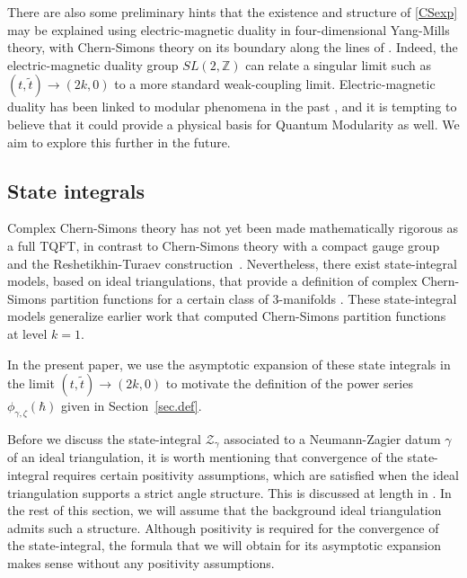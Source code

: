 \documentclass[12pt]{amsart}
\theoremstyle{definition}
\def\ga{\gamma}
\newcommand{\CZ}{\mathcal{Z}}
\begin{document}
There are also some preliminary hints that the 
existence and structure of \eqref{CSexp} may be explained using 
electric-magnetic duality in four-dimensional Yang-Mills theory, with 
Chern-Simons theory on its boundary along the lines of \cite{Witten-q, Witten-5}. 
Indeed, the electric-magnetic duality group $SL(2,\mathbb Z)$ can relate a 
singular limit such as $(t,\tilde t)\to(2k,0)$ to a more standard 
weak-coupling limit. Electric-magnetic duality has been linked to modular 
phenomena in the past \cite{VafaWitten}, and it is tempting to believe that 
it could provide a physical basis for Quantum Modularity as well.
We aim to explore this further in the future.

\subsection{State integrals}

Complex Chern-Simons theory has not yet been made mathematically rigorous 
as a full TQFT, in contrast to Chern-Simons theory with a compact gauge
group~\cite{Witten-jones} and the Reshetikhin-Turaev construction~\cite{RT}. 
Nevertheless, there exist state-integral 
models, based on ideal triangulations, that provide a definition of 
complex Chern-Simons partition functions for a certain class of 3-manifolds 
\cite{D-levelk, AK}. These state-integral models generalize earlier work 
\cite{Hikami, DGLZ, Dimofte-QRS, AK-TQFT, AK-new} that computed Chern-Simons 
partition functions at level $k=1$.

In the present paper, we use the asymptotic expansion of these state 
integrals in the limit $(t,\tilde t)\to(2k,0)$ to motivate the
definition of the power series $\phi_{\gamma,\zeta}(\hbar)$ given in 
Section~\ref{sec.def}.

Before we discuss the state-integral $\CZ_\gamma$ associated to a 
Neumann-Zagier datum $\ga$ of an ideal triangulation, it is worth mentioning
that convergence of the state-integral  requires certain positivity 
assumptions, which are satisfied when the ideal triangulation supports a 
strict angle structure. This is discussed at length in \cite{AK, D-levelk}. 
In the rest of this section, we will assume that the background ideal 
triangulation admits such a structure. Although positivity is required for 
the convergence of the state-integral, the formula that we will obtain for 
its asymptotic expansion makes sense without any positivity assumptions.
\end{document}
